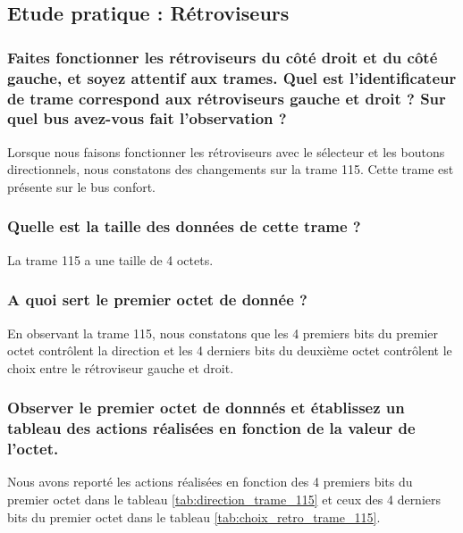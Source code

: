 \documentclass{rapportECC}
\begin{document}

\subsection{Etude pratique : Rétroviseurs}

\subsubsection*{Faites fonctionner les rétroviseurs du côté droit et du côté gauche, et soyez attentif aux trames. Quel est l'identificateur de trame correspond aux rétroviseurs gauche et droit ?  Sur quel bus avez-vous fait l'observation ?}

Lorsque nous faisons fonctionner les rétroviseurs avec le sélecteur et les boutons directionnels, nous constatons des changements sur la trame 115. Cette trame est présente sur le bus confort.

\subsubsection*{Quelle est la taille des données de cette trame ?}

La trame 115 a une taille de 4 octets.

\subsubsection*{A quoi sert le premier octet de donnée ?}

En observant la trame 115, nous constatons que les 4 premiers bits du premier octet contrôlent la direction et les 4 derniers bits du deuxième octet contrôlent le choix entre le rétroviseur gauche et droit.

\subsubsection*{Observer le premier octet de donnnés et établissez un tableau des actions  réalisées en fonction de la valeur de l'octet.}

Nous avons reporté les actions réalisées en fonction des 4 premiers bits du premier octet dans le tableau \ref{tab:direction_trame_115} et ceux des 4 derniers bits du premier octet dans le tableau \ref{tab:choix_retro_trame_115}.
\end{document}
